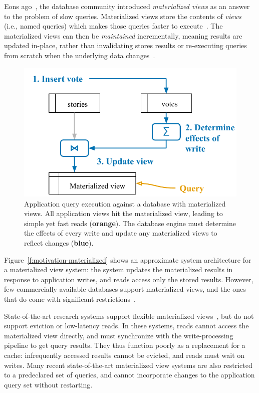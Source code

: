 
Eons ago~\cite{relational-materialized-views,stonebraker-views}, the database
community introduced \textit{materialized views} as an answer to the problem of
slow queries. Materialized views store the contents of \textit{views} (i.e.,
named queries) which makes those queries faster to
execute~\cite{materialized-views}. The materialized views can then be
\textit{maintained} incrementally, meaning results are updated in-place, rather
than invalidating stores results or re-executing queries from scratch when the
underlying data changes~\cite{materialized-survey}.

\begin{figure}
  \centering
  \includegraphics{diagrams/Motivation Materialized Views.pdf}
  \caption{Application query execution against a database with materialized
  views. All application views hit the materialized view, leading to simple
  yet fast reads (\textbf{\color{set2}orange}). The database engine must
  determine the effects of every write and update any materialized views to
  reflect changes (\textbf{\color{set1}blue}).}
  \label{f:motivation-materialized}
\end{figure}

Figure~\vref{f:motivation-materialized} shows an approximate system architecture
for a materialized view system: the system updates the materialized results in
response to application writes, and reads access only the stored results.
However, few commercially available databases support materialized views, and
the ones that do come with significant
restrictions~\cite{mssql-materialized-view-restrictions}.

State-of-the-art research systems support flexible materialized
views~\cite{dbtoaster,materialize}, but do not support eviction or low-latency
reads. In these systems, reads cannot access the materialized view directly, and
must synchronize with the write-processing pipeline to get query results. They
thus function poorly as a replacement for a cache: infrequently accessed results
cannot be evicted, and reads must wait on writes. Many recent state-of-the-art
materialized view systems are also restricted to a predeclared set of queries,
and cannot incorporate changes to the application query set without restarting.

